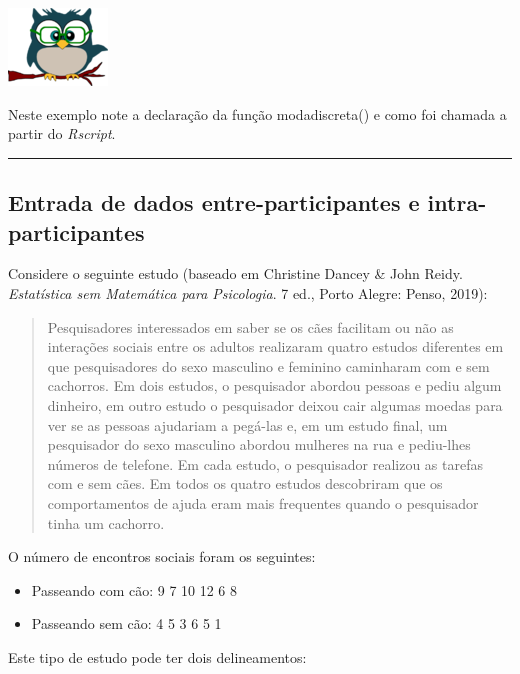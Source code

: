 \documentclass[
]{article}
\providecommand{\tightlist}{%
  \setlength{\itemsep}{0pt}\setlength{\parskip}{0pt}}
\begin{document}
\begin{flushleft}\includegraphics[width=0.08\linewidth]{coruja} \end{flushleft}

Neste exemplo note a declaração da função modadiscreta() e como foi
chamada a partir do \emph{Rscript}.

\begin{center}\rule{0.5\linewidth}{0.5pt}\end{center}

\hypertarget{entrada-de-dados-entre-participantes-e-intra-participantes}{%
\subsection{Entrada de dados entre-participantes e
intra-participantes}\label{entrada-de-dados-entre-participantes-e-intra-participantes}}

Considere o seguinte estudo (baseado em Christine Dancey \& John Reidy.
\emph{Estatística sem Matemática para Psicologia}. 7 ed., Porto Alegre:
Penso, 2019):

\begin{quote}
Pesquisadores interessados em saber se os cães facilitam ou não as
interações sociais entre os adultos realizaram quatro estudos diferentes
em que pesquisadores do sexo masculino e feminino caminharam com e sem
cachorros. Em dois estudos, o pesquisador abordou pessoas e pediu algum
dinheiro, em outro estudo o pesquisador deixou cair algumas moedas para
ver se as pessoas ajudariam a pegá-las e, em um estudo final, um
pesquisador do sexo masculino abordou mulheres na rua e pediu-lhes
números de telefone. Em cada estudo, o pesquisador realizou as tarefas
com e sem cães. Em todos os quatro estudos descobriram que os
comportamentos de ajuda eram mais frequentes quando o pesquisador tinha
um cachorro.
\end{quote}

O número de encontros sociais foram os seguintes:

\begin{itemize}
\tightlist
\item
  Passeando com cão: 9 7 10 12 6 8
\item
  Passeando sem cão: 4 5 3 6 5 1
\end{itemize}

Este tipo de estudo pode ter dois delineamentos:
\end{document}
